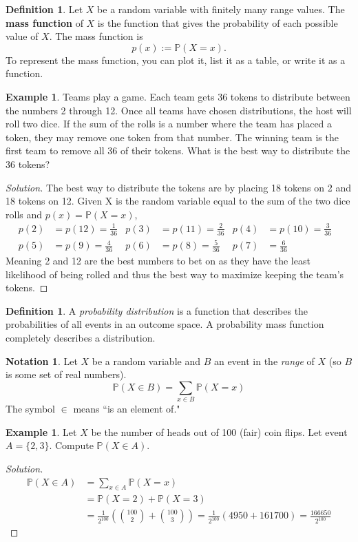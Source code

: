 \documentclass[12pt]{article}
\newcommand{\bbP}{\mathbb{P}}
\renewcommand{\_}[1]{\underline{ #1 }}
\theoremstyle{definition}
\newtheorem{definition}[theorem]{Definition}
\newtheorem{example}[theorem]{Example}
\newtheorem{notation}[theorem]{Notation}
\numberwithin{equation}{subsection}
\begin{document}
\begin{definition}
	Let $X$ be a random variable with finitely many range values. The \textbf{mass function} of $X$ is the function that gives the probability of each possible value of $X$. The mass function is \[p(x):=\mathbb{P}(X=x).\] To represent the mass function, you can plot it, list it as a table, or write it as a function. 
\end{definition}

\begin{example}
	Teams play a game. Each team gets 36 tokens to distribute between the numbers 2 through 12. Once all teams have chosen distributions, the host will roll two dice. If the sum of the rolls is a number where the team has placed a token, they may remove one token from that number. The winning team is the first team to remove all 36 of their tokens. What is the best way to distribute the 36 tokens?
	\begin{proof}[Solution]
		The best way to distribute the tokens are by placing 18 tokens on 2 and 18 tokens on 12. Given X is the random variable equal to the sum of the two dice rolls and $p(x)=\bbP(X=x)$, 
		\begin{align*}
			p(2)&=p(12)=\frac{1}{36} &
			p(3)&=p(11)=\frac{2}{36} &
			p(4)&=p(10)=\frac{3}{36} & \\
			p(5)&=p(9)=\frac{4}{36} &
			p(6)&=p(8)=\frac{5}{36} & 
			p(7)&=\frac{6}{36}
		\end{align*}
		Meaning 2 and 12 are the best numbers to bet on as they have the least likelihood of being rolled and thus the best way to maximize keeping the team's tokens.
	\end{proof}
\end{example}

\begin{definition}
	A \emph{probability distribution} is a function that describes the probabilities of all events in an outcome space. A probability mass function completely describes a distribution.
\end{definition}

\begin{notation}
	Let $X$ be a random variable and $B$ an event in the \textit{range} of $X$ (so $B$ is some set of real numbers). 
	\[\mathbb{P}(X\in B)=\sum_{x\in B} \mathbb{P}(X=x)\]
	The symbol $\in$ means ``is an element of."
\end{notation}


\begin{example}
	Let $X$ be the number of heads out of 100 (fair) coin flips. Let event $A=\{2,3\}$. Compute $\mathbb{P}(X\in A)$.
	\begin{proof}[Solution]
	\begin{align*}
		\bbP(X\in A)&=\sum_{x\in A} \bbP(X=x) \\
			&=\bbP(X=2)+\bbP(X=3) \\
			&=\frac{1}{2^{100}}\left({100\choose 2}+{100\choose 3}\right)=\frac{1}{2^{100}}\left(4950+161700\right)=\frac{166650}{2^{100}}
	\end{align*}
	\end{proof}
\end{example} 
\end{document}
